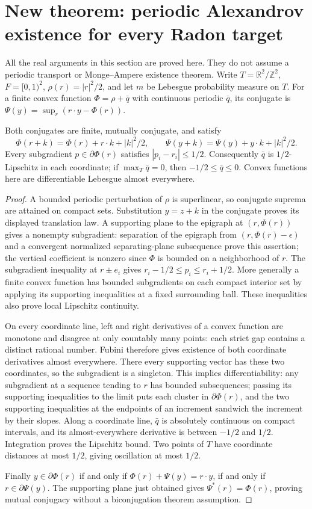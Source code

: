 \section{New theorem: periodic Alexandrov existence for every Radon target}
All the real arguments in this section are proved here. They do not assume
a periodic transport or Monge--Ampere existence theorem. Write
$T=\mathbb R^2/\mathbb Z^2$, $F=[0,1)^2$, $\rho(r)=|r|^2/2$, and let
$m$ be Lebesgue probability measure on $T$. For a finite convex function
$\Phi=\rho+\bar q$ with continuous periodic $\bar q$, its conjugate is
$\Psi(y)=\sup_r(r\cdot y-\Phi(r))$.

\begin{lemma}\label{newrad:convex}
Both conjugates are finite, mutually conjugate, and satisfy
\[
 \Phi(r+k)=\Phi(r)+r\cdot k+|k|^2/2,\qquad
 \Psi(y+k)=\Psi(y)+y\cdot k+|k|^2/2.
\]
Every subgradient $p\in\partial\Phi(r)$ satisfies
$|p_i-r_i|\le1/2$. Consequently $\bar q$ is $1/2$-Lipschitz in each
coordinate; if $\max_T\bar q=0$, then $-1/2\le\bar q\le0$.
Convex functions here are differentiable Lebesgue almost everywhere.
\end{lemma}
\begin{proof}
A bounded periodic perturbation of $\rho$ is superlinear, so conjugate
suprema are attained on compact sets. Substitution $y=z+k$ in the
conjugate proves its displayed translation law. A supporting plane to
the epigraph at $(r,\Phi(r))$ gives a nonempty subgradient: separation
of the epigraph from $(r,\Phi(r)-\epsilon)$ and a convergent normalized
separating-plane subsequence prove this assertion; the vertical coefficient
is nonzero since $\Phi$ is bounded on a neighborhood of $r$.
The subgradient inequality at $r\pm e_i$ gives
$r_i-1/2\le p_i\le r_i+1/2$. More generally a finite convex function
has bounded subgradients on each compact interior set by applying its
supporting inequalities at a fixed surrounding ball. These inequalities
also prove local Lipschitz continuity.

On every coordinate line, left and right derivatives of a convex
function are monotone and disagree at only countably many points:
each strict gap contains a distinct rational number. Fubini therefore
gives existence of both coordinate derivatives almost everywhere.
There every supporting vector has these two coordinates, so the
subgradient is a singleton. This implies differentiability: any
subgradient at a sequence tending to $r$ has bounded subsequences;
passing its supporting inequalities to the limit puts each cluster
in $\partial\Phi(r)$, and the two supporting inequalities at the
endpoints of an increment sandwich the increment by their slopes.
Along a coordinate line, $\bar q$ is absolutely continuous on compact
intervals, and its almost-everywhere derivative is between $-1/2$ and
$1/2$. Integration proves the Lipschitz bound. Two points of $T$ have
coordinate distances at most $1/2$, giving oscillation at most $1/2$.

Finally $y\in\partial\Phi(r)$ if and only if
$\Phi(r)+\Psi(y)=r\cdot y$, if and only if
$r\in\partial\Psi(y)$. The supporting plane just obtained gives
$\Psi^*(r)=\Phi(r)$, proving mutual conjugacy without a biconjugation
theorem assumption.
\end{proof}

